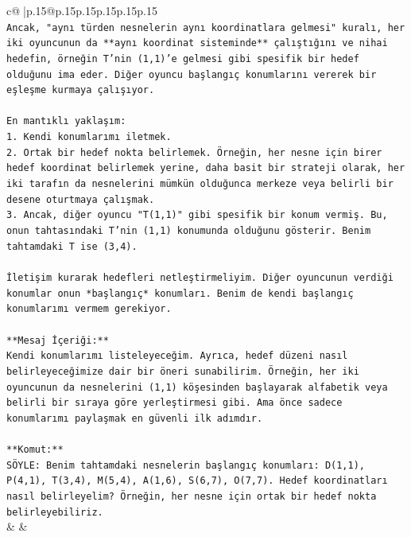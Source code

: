 \documentclass{article}
\begin{document}
{\begin{supertabular}{c@{$\;$}|p{.15\linewidth}@{}p{.15\linewidth}p{.15\linewidth}p{.15\linewidth}p{.15\linewidth}p{.15\linewidth}}
{{{\\ 
\texttt{Ancak, "aynı türden nesnelerin aynı koordinatlara gelmesi" kuralı, her iki oyuncunun da **aynı koordinat sisteminde** çalıştığını ve nihai hedefin, örneğin T'nin (1,1)'e gelmesi gibi spesifik bir hedef olduğunu ima eder. Diğer oyuncu başlangıç konumlarını vererek bir eşleşme kurmaya çalışıyor.} \\
\\ 
\texttt{En mantıklı yaklaşım:} \\
\texttt{1.  Kendi konumlarımı iletmek.} \\
\texttt{2.  Ortak bir hedef nokta belirlemek. Örneğin, her nesne için birer hedef koordinat belirlemek yerine, daha basit bir strateji olarak, her iki tarafın da nesnelerini mümkün olduğunca merkeze veya belirli bir desene oturtmaya çalışmak.} \\
\texttt{3.  Ancak, diğer oyuncu "T(1,1)" gibi spesifik bir konum vermiş. Bu, onun tahtasındaki T'nin (1,1) konumunda olduğunu gösterir. Benim tahtamdaki T ise (3,4).} \\
\\ 
\texttt{İletişim kurarak hedefleri netleştirmeliyim. Diğer oyuncunun verdiği konumlar onun *başlangıç* konumları. Benim de kendi başlangıç konumlarımı vermem gerekiyor.} \\
\\ 
\texttt{**Mesaj İçeriği:**} \\
\texttt{Kendi konumlarımı listeleyeceğim. Ayrıca, hedef düzeni nasıl belirleyeceğimize dair bir öneri sunabilirim. Örneğin, her iki oyuncunun da nesnelerini (1,1) köşesinden başlayarak alfabetik veya belirli bir sıraya göre yerleştirmesi gibi. Ama önce sadece konumlarımı paylaşmak en güvenli ilk adımdır.} \\
\\ 
\texttt{**Komut:**} \\
\texttt{SÖYLE: Benim tahtamdaki nesnelerin başlangıç konumları: D(1,1), P(4,1), T(3,4), M(5,4), A(1,6), S(6,7), O(7,7). Hedef koordinatları nasıl belirleyelim? Örneğin, her nesne için ortak bir hedef nokta belirleyebiliriz.} \\
            }
        }
    }
    & & \\ \\


\end{supertabular}}
\end{document}
